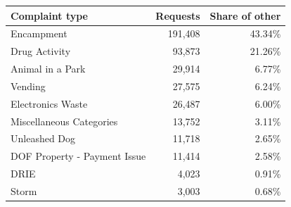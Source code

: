 \documentclass[10pt]{article}
\begin{document}
\begin{table}[h]
\centering
\begin{tabular}{@{}lrr@{}}
\toprule
Complaint type & Requests & Share of other \\
\midrule
Encampment & 191,408 & 43.34\% \\
Drug Activity & 93,873 & 21.26\% \\
Animal in a Park & 29,914 & 6.77\% \\
Vending & 27,575 & 6.24\% \\
Electronics Waste & 26,487 & 6.00\% \\
Miscellaneous Categories & 13,752 & 3.11\% \\
Unleashed Dog & 11,718 & 2.65\% \\
DOF Property - Payment Issue & 11,414 & 2.58\% \\
DRIE & 4,023 & 0.91\% \\
Storm & 3,003 & 0.68\% \\
\bottomrule
\end{tabular}
\end{table}
\end{document}

